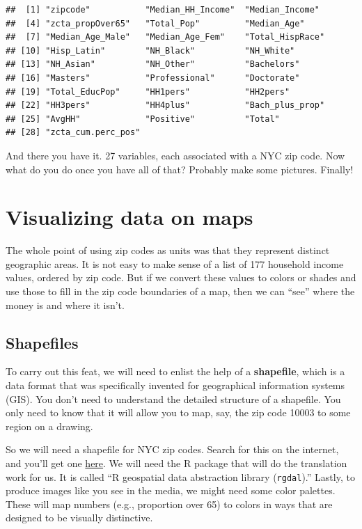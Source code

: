 \documentclass[
  openany]{book}
\begin{document}
\begin{verbatim}
##  [1] "zipcode"           "Median_HH_Income"  "Median_Income"
##  [4] "zcta_propOver65"   "Total_Pop"         "Median_Age"
##  [7] "Median_Age_Male"   "Median_Age_Fem"    "Total_HispRace"
## [10] "Hisp_Latin"        "NH_Black"          "NH_White"
## [13] "NH_Asian"          "NH_Other"          "Bachelors"
## [16] "Masters"           "Professional"      "Doctorate"
## [19] "Total_EducPop"     "HH1pers"           "HH2pers"
## [22] "HH3pers"           "HH4plus"           "Bach_plus_prop"
## [25] "AvgHH"             "Positive"          "Total"
## [28] "zcta_cum.perc_pos"
\end{verbatim}

And there you have it. 27 variables, each associated with a NYC zip code. Now what do you do once you have all of that? Probably make some pictures. Finally!

\hypertarget{mapviz}{%
\section{Visualizing data on maps}\label{mapviz}}

The whole point of using zip codes as units was that they represent distinct geographic areas. It is not easy to make sense of a list of 177 household income values, ordered by zip code. But if we convert these values to colors or shades and use those to fill in the zip code boundaries of a map, then we can ``see'' where the money is and where it isn't.

\hypertarget{shapefiles}{%
\subsection*{Shapefiles}\label{shapefiles}}

To carry out this feat, we will need to enlist the help of a \textbf{shapefile}, which is a data format that was specifically invented for geographical information systems (GIS). You don't need to understand the detailed structure of a shapefile. You only need to know that it will allow you to map, say, the zip code 10003 to some region on a drawing.

So we will need a shapefile for NYC zip codes. Search for this on the internet, and you'll get one \href{https://catalog.data.gov/dataset/zip-code-boundaries}{here}. We will need the R package that will do the translation work for us. It is called ``R geospatial data abstraction library (\texttt{rgdal}).'' Lastly, to produce images like you see in the media, we might need some color palettes. These will map numbers (e.g., proportion over 65) to colors in ways that are designed to be visually distinctive.
\end{document}
